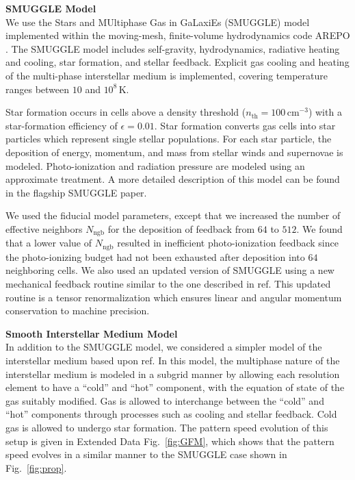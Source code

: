 \documentclass{natureprintstyle}
\begin{document}
\noindent
{\bf SMUGGLE Model}
\\
\noindent
We use the Stars and MUltiphase Gas in GaLaxiEs (SMUGGLE) model
\cite{2019MNRAS.489.4233M} implemented within the moving-mesh, finite-volume
hydrodynamics code AREPO \cite{2010MNRAS.401..791S}. The SMUGGLE model
includes self-gravity, hydrodynamics, radiative heating and cooling, star
formation, and stellar feedback. Explicit gas cooling and heating of the
multi-phase interstellar medium is implemented, covering temperature ranges
between $10$ and $10^8\,\textrm{K}$.

Star formation occurs in cells above a density threshold
($n_{\textrm{th}}=100\,\textrm{cm}^{-3}$) with a star-formation efficiency of
$\epsilon = 0.01$. Star formation converts gas cells into star particles which
represent single stellar populations. For each star particle, the deposition
of energy, momentum, and mass from stellar winds and supernovae is modeled.
Photo-ionization and radiation pressure are modeled using an approximate
treatment. A more detailed description of this model can be found in the
flagship SMUGGLE paper.\cite{2019MNRAS.489.4233M}

We used the fiducial model parameters, except that we increased the number of
effective neighbors $N_{\textrm{ngb}}$ for the deposition of feedback from
$64$ to $512$. We found that a lower value of $N_{\textrm{ngb}}$ resulted in
inefficient photo-ionization feedback since the photo-ionizing budget had not
been exhausted after deposition into $64$ neighboring cells. We also used an
updated version of SMUGGLE using a new mechanical feedback routine similar to
the one described in ref.\cite{2018MNRAS.480..800H} This updated routine is a
tensor renormalization which ensures linear and angular momentum conservation
to machine precision.

\vspace{12pt}

\noindent
{\bf Smooth Interstellar Medium Model}
\\
\noindent
In addition to the SMUGGLE model, we considered a simpler model of the
interstellar medium based upon ref.\cite{2003MNRAS.339..289S} In this model,
the multiphase nature of the interstellar medium is modeled in a subgrid
manner by allowing each resolution element to have a ``cold'' and ``hot''
component, with the equation of state of the gas suitably modified. Gas is
allowed to interchange between the ``cold'' and ``hot'' components through
processes such as cooling and stellar feedback. Cold gas is allowed to undergo
star formation. The pattern speed evolution of this setup is given in Extended
Data Fig.~\ref{fig:GFM}, which shows that the pattern speed evolves in a
similar manner to the SMUGGLE case shown in Fig.~\ref{fig:prop}.
\end{document}
